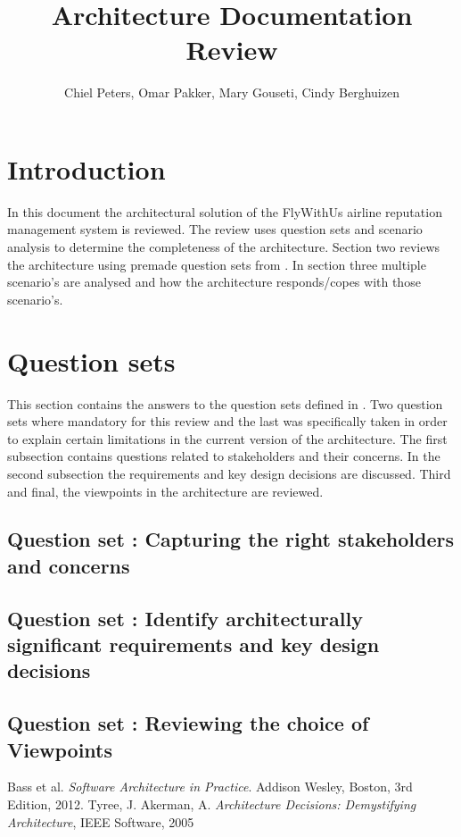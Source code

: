 \documentclass{article}
\begin{document}
\title{Architecture Documentation Review}
\author{Chiel Peters, Omar Pakker, Mary Gouseti, Cindy Berghuizen}
\maketitle
\setlength\parindent{0pt}
\newcommand{\blank}[1]{\hspace*{#1}}

\section{Introduction}

In this document the architectural solution of the FlyWithUs airline reputation management system is reviewed. The review uses question sets and scenario analysis to determine the completeness
of the architecture. Section two reviews the architecture using premade question sets from \cite{tyree}. In section three multiple scenario's are analysed and how the architecture responds/copes with those scenario's. 

\section{Question sets}

This section contains the answers to the question sets defined in \cite{tyree}. Two question sets where mandatory for this review and the last was specifically taken in order to explain certain limitations in the current version of
the architecture. The first subsection contains questions related to stakeholders and their concerns. In the second subsection the requirements and key design decisions are discussed. Third and final, the viewpoints in the architecture
are reviewed.

\subsection{Question set : Capturing the right stakeholders and concerns}


\newpage
\subsection{Question set : Identify architecturally significant requirements and key design decisions}


\newpage
\subsection{Question set : Reviewing the choice of Viewpoints}

\newpage


\begin{thebibliography}{9}
Bass et al.
  \emph{Software Architecture in Practice}.
  Addison Wesley, Boston,
  3rd Edition,
  2012.
Tyree, J.  Akerman, A. 
\emph{Architecture Decisions:
Demystifying Architecture},
IEEE Software,
2005

\end{thebibliography}
\end{document}
